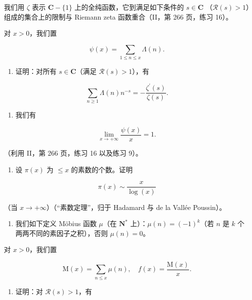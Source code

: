 我们用 \(\zeta\) 表示 \(\mathbf{C} - \{1\}\) 上的全纯函数，它到满足如下条件的 \(s \in \mathbf{C}\) （\(\mathcal{R}(s) > 1\)）组成的集合上的限制与 Riemann zeta 函数重合（II，第 266 页，练习 16）。

对 \(x > 0\)，我们置

\[
\psi (x) = \sum_ {1 \leqslant n \leqslant x} \Lambda (n).
\]

\begin{enumerate}
\def\labelenumi{\alph{enumi})}
\tightlist
\item
  证明：对所有 \(s \in \mathbf{C}\)（满足 \(\mathcal{R}(s) > 1\)），有
\end{enumerate}

\[
\sum_ {n \geqslant 1} \Lambda (n) n ^ {- s} = - \frac {\zeta^ {\prime} (s)}{\zeta (s)}.
\]

\begin{enumerate}
\def\labelenumi{\alph{enumi})}
\setcounter{enumi}{1}
\tightlist
\item
  我们有
\end{enumerate}

\[
\lim _ {x \to + \infty} \frac {\psi (x)}{x} = 1.
\]

（利用 II，第 266 页，练习 16 以及练习 9）。

\begin{enumerate}
\def\labelenumi{\alph{enumi})}
\setcounter{enumi}{2}
\tightlist
\item
  设 \(\pi(x)\) 为 \(\leqslant x\) 的素数的个数。证明
\end{enumerate}

\[
\pi (x) \sim \frac {x}{\log (x)}
\]

（当 \(x \to +\infty\)）（“素数定理”，归于 Hadamard 与 de la Vallée Poussin）。

\begin{enumerate}
\def\labelenumi{\arabic{enumi})}
\setcounter{enumi}{10}
\tightlist
\item
  我们如下定义 Möbius 函数 \(\mu\)（在 \(\mathbf{N}^*\) 上）：\(\mu(n) = (-1)^k\)（若 \(n\) 是 \(k\) 个两两不同的素因子之积），否则 \(\mu(n) = 0\)。
\end{enumerate}

对 \(x > 0\)，我们置

\[
\mathrm{M} (x) = \sum_ {n \leqslant x} \mu (n), \quad f (x) = \frac {\mathrm{M} (x)}{x}.
\]

\begin{enumerate}
\def\labelenumi{\alph{enumi})}
\tightlist
\item
  证明：对 \(\mathcal{R}(s) > 1\)，有
\end{enumerate}

